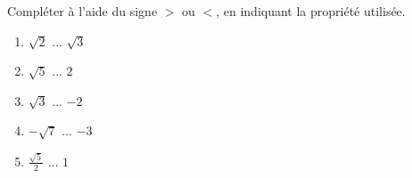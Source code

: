 
%
Compléter à l'aide du signe $ > $ ou $ < $, en indiquant la propriété utilisée.
\begin{enumerate}
     \item
     $\sqrt{2}$ ... $\sqrt{3}$
     \item
     $\sqrt{5}$ ... $2$
     \item
     $\sqrt{3}$ ... $-2$
     \item
     $-\sqrt{7}$ ... $-3$
     \item
     $\frac{\sqrt{5}}{2}$ ... $1$
\end{enumerate}
